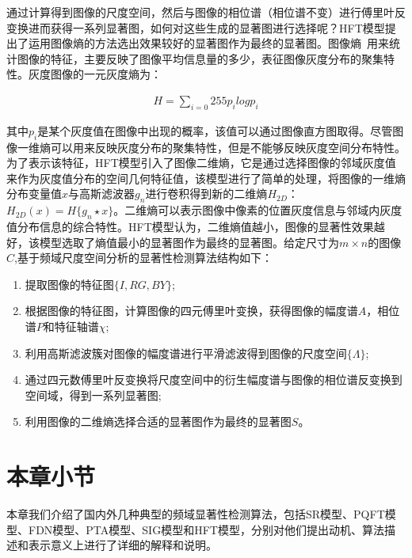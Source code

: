 通过计算得到图像的尺度空间，然后与图像的相位谱（相位谱不变）进行傅里叶反变换进而获得一系列显著图，如何对这些生成的显著图进行选择呢？HFT模型提出了运用图像熵的方法选出效果较好的显著图作为最终的显著图。图像熵~\cite{Abutaleb1989Automatic}用来统计图像的特征，主要反映了图像平均信息量的多少，表征图像灰度分布的聚集特性。灰度图像的一元灰度熵为：
\begin{linenomath}
\begin{align}
H=\sum_{i=0}{255}p_{i}log p_{i}
\label{式3_34}
\end{align}
\end{linenomath}
其中$p_{i}$是某个灰度值在图像中出现的概率，该值可以通过图像直方图取得。尽管图像一维熵可以用来反映灰度分布的聚集特性，但是不能够反映灰度空间分布特性。为了表示该特征，HFT模型引入了图像二维熵，它是通过选择图像的邻域灰度值来作为灰度值分布的空间几何特征值，该模型进行了简单的处理，将图像的一维熵分布变量值$x$与高斯滤波器$g_{n}$进行卷积得到新的二维熵$H_{2D}$：$H_{2D}(x)=H\{g_{n}\star x\}$。二维熵可以表示图像中像素的位置灰度信息与邻域内灰度值分布信息的综合特性。HFT模型认为，二维熵值越小，图像的显著性效果越好，该模型选取了熵值最小的显著图作为最终的显著图。给定尺寸为$m×n$的图像$C$,基于频域尺度空间分析的显著性检测算法结构如下：
\begin{enumerate}
\item 提取图像的特征图$\{I,RG,BY\}$;
\item 根据图像的特征图，计算图像的四元傅里叶变换，获得图像的幅度谱$A$，相位谱$P$和特征轴谱$\chi$;
\item 利用高斯滤波簇对图像的幅度谱进行平滑滤波得到图像的尺度空间$\{\Lambda\}$;
\item 通过四元数傅里叶反变换将尺度空间中的衍生幅度谱与图像的相位谱反变换到空间域，得到一系列显著图;
\item 利用图像的二维熵选择合适的显著图作为最终的显著图$S$。
\end{enumerate}

\section{本章小节}
\label{3_7}

本章我们介绍了国内外几种典型的频域显著性检测算法，包括SR模型、PQFT模型、FDN模型、PTA模型、SIG模型和HFT模型，分别对他们提出动机、算法描述和表示意义上进行了详细的解释和说明。
